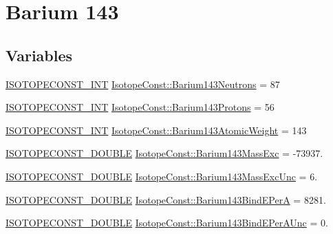 \hypertarget{group___isotope_const-_barium-_ba143}{}\section{Barium 143}
\label{group___isotope_const-_barium-_ba143}
\subsection*{Variables}
\begin{DoxyCompactItemize}
\item 
\mbox{\hyperlink{group___isotope_const-_macros_ga5f18360b3e99483a35c32d789e62621c}{I\+S\+O\+T\+O\+P\+E\+C\+O\+N\+S\+T\+\_\+\+I\+NT}} \mbox{\hyperlink{group___isotope_const-_barium-_ba143_gac70e1d3eeee2d7200454fe2a3c586756}{Isotope\+Const\+::\+Barium143\+Neutrons}} = 87
\item 
\mbox{\hyperlink{group___isotope_const-_macros_ga5f18360b3e99483a35c32d789e62621c}{I\+S\+O\+T\+O\+P\+E\+C\+O\+N\+S\+T\+\_\+\+I\+NT}} \mbox{\hyperlink{group___isotope_const-_barium-_ba143_ga164f350473e5c987da36e2952803f43b}{Isotope\+Const\+::\+Barium143\+Protons}} = 56
\item 
\mbox{\hyperlink{group___isotope_const-_macros_ga5f18360b3e99483a35c32d789e62621c}{I\+S\+O\+T\+O\+P\+E\+C\+O\+N\+S\+T\+\_\+\+I\+NT}} \mbox{\hyperlink{group___isotope_const-_barium-_ba143_ga7e72b0b40c961e059197130da15276c4}{Isotope\+Const\+::\+Barium143\+Atomic\+Weight}} = 143
\item 
\mbox{\hyperlink{group___isotope_const-_macros_ga8f45a7272ce02c0b4c65c44636ed719a}{I\+S\+O\+T\+O\+P\+E\+C\+O\+N\+S\+T\+\_\+\+D\+O\+U\+B\+LE}} \mbox{\hyperlink{group___isotope_const-_barium-_ba143_ga13565c2379d70ee1c1dcaecc3a4607fc}{Isotope\+Const\+::\+Barium143\+Mass\+Exc}} = -\/73937.
\item 
\mbox{\hyperlink{group___isotope_const-_macros_ga8f45a7272ce02c0b4c65c44636ed719a}{I\+S\+O\+T\+O\+P\+E\+C\+O\+N\+S\+T\+\_\+\+D\+O\+U\+B\+LE}} \mbox{\hyperlink{group___isotope_const-_barium-_ba143_ga0cc12ca4da231ca6afb648cc992716ff}{Isotope\+Const\+::\+Barium143\+Mass\+Exc\+Unc}} = 6.
\item 
\mbox{\hyperlink{group___isotope_const-_macros_ga8f45a7272ce02c0b4c65c44636ed719a}{I\+S\+O\+T\+O\+P\+E\+C\+O\+N\+S\+T\+\_\+\+D\+O\+U\+B\+LE}} \mbox{\hyperlink{group___isotope_const-_barium-_ba143_ga0414fc8ea40ddafc56647ca7955d8dc9}{Isotope\+Const\+::\+Barium143\+Bind\+E\+PerA}} = 8281.
\item 
\mbox{\hyperlink{group___isotope_const-_macros_ga8f45a7272ce02c0b4c65c44636ed719a}{I\+S\+O\+T\+O\+P\+E\+C\+O\+N\+S\+T\+\_\+\+D\+O\+U\+B\+LE}} \mbox{\hyperlink{group___isotope_const-_barium-_ba143_ga10e0c61c03ad5b1686eb14402d6381e5}{Isotope\+Const\+::\+Barium143\+Bind\+E\+Per\+A\+Unc}} = 0.

\end{DoxyCompactItemize}
